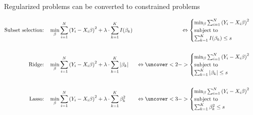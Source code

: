 \documentclass[mathserif, aspectratio=169]{beamer}
\begin{document}
\begin{frame}{Regularized problems can be converted to constrained problems}

\begin{align*}
\text{Subset selection:} \quad &\min_\beta \sum_{i=1}^N \left(Y_i - X_i \beta \right)^2+\lambda \cdot \sum_{k=1}^K I(\beta_k)
&\Leftrightarrow
{\begin{cases}
\min_\beta \sum_{i=1}^N \left(Y_i - X_i \beta \right)^2\\
\text{subject to}\\
\sum_{k=1}^K I(\beta_k) \le s
\end{cases}}\\\\
%
\text{Ridge:} \quad  &\min_\beta \sum_{i=1}^N \left(Y_i - X_i \beta \right)^2+\lambda \cdot \sum_{k=1}^K |\beta_k|
&\Leftrightarrow
\uncover<2->{\begin{cases}
\min_\beta \sum_{i=1}^N \left(Y_i - X_i \beta \right)^2\\
\text{subject to}\\
\sum_{k=1}^K |\beta_k | \le s
\end{cases}}\\\\
%
\text{Lasso:} \quad  &\min_\beta \sum_{i=1}^N \left(Y_i - X_i \beta \right)^2+\lambda \cdot \sum_{k=1}^K \beta_k^2 
&\Leftrightarrow
\uncover<3->{\begin{cases}
\min_\beta \sum_{i=1}^N \left(Y_i - X_i \beta \right)^2\\
\text{subject to}\\
\sum_{k=1}^K \beta_k^2 \le s
\end{cases}}
\end{align*}

\end{frame}
\end{document}
